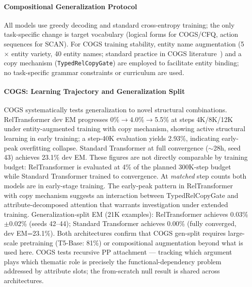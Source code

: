 \documentclass[conference]{IEEEtran}
\begin{document}
\paragraph{Compositional Generalization Protocol}
All models use greedy decoding and standard cross-entropy training; the only task-specific change is target vocabulary (logical forms for COGS/CFQ, action sequences for SCAN). For COGS training stability, entity name augmentation (5$\times$ entity variety, 40 entity names; standard practice in COGS literature~\cite{kim2020cogs}) and a copy mechanism (\texttt{TypedRelCopyGate}) are employed to facilitate entity binding; no task-specific grammar constraints or curriculum are used.

\paragraph{COGS: Learning Trajectory and Generalization Split}
COGS systematically tests generalization to novel structural combinations. RelTransformer dev EM progresses 0\%$\to$4.0\%$\to$5.5\% at steps 4K/8K/12K under entity-augmented training with copy mechanism, showing active structural learning in early training; a step-40K evaluation yields 2.93\%, indicating early-peak overfitting collapse. Standard Transformer at full convergence (${\sim}$28h, seed 43) achieves 23.1\% dev EM. These figures are not directly comparable by training budget: RelTransformer is evaluated at 4\% of the planned 300K-step budget while Standard Transformer trained to convergence. At \emph{matched} step counts both models are in early-stage training. The early-peak pattern in RelTransformer with copy mechanism suggests an interaction between TypedRelCopyGate and attribute-decomposed attention that warrants investigation under extended training. Generalization-split EM (21K examples): RelTransformer achieves 0.03\%$\pm$0.02\% (seeds 42--44); Standard Transformer achieves 0.00\% (fully converged, dev EM=23.1\%). Both architectures confirm that COGS gen-split requires large-scale pretraining (T5-Base: 81\%) or compositional augmentation beyond what is used here. COGS tests recursive PP attachment --- tracking which argument plays which thematic role is precisely the functional-dependency problem addressed by attribute slots; the from-scratch null result is shared across architectures.
\end{document}
